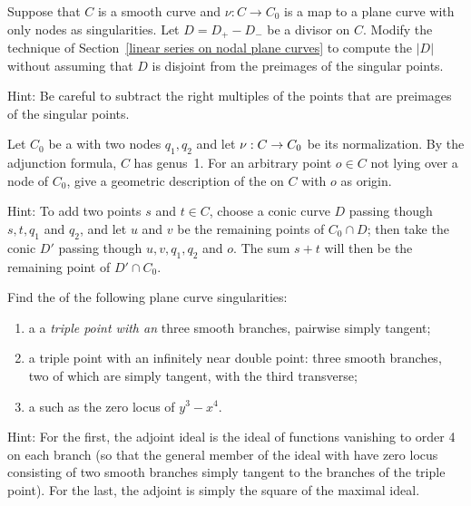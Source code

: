 \begin{exercise}\label{general case of divisors on nodal curves}
Suppose that $C$ is a smooth curve and $\nu: C \to C_0$ is a map to a
plane curve with
only nodes as singularities. Let $D = D_{+}-D_{-}$ be a divisor on
$C$. Modify the
technique of Section~\ref{linear series on nodal plane curves} to compute
the 
$|D|$ without assuming that $D$ is disjoint from the
preimages of the singular
points.

Hint: Be careful to subtract the right multiples of the points that are
preimages of the singular
points.
\end{exercise}

\begin{exercise}
Let $C_0$ be a 
%
%
with two nodes $q_1, q_2$
and
let $\nu :\nobreak C \to C_0$ be its normalization.
%
By the adjunction formula, $C$ has genus~1.
For an arbitrary point
$o \in C$ not
lying over a node of $C_0$,
 give a geometric description
of the 
on $C$ with $o$ as origin.

Hint: To add two points $s$ and $t \in C$, choose a conic curve $D$
passing though $s, t, q_1$ and $q_2$, and let $u$ and $v$ be the remaining
points of $C_0 \cap D$; then take the conic
$D'$ passing though $u, v,
q_1, q_2$ and $o$. The sum $s+t$ will then be the remaining point of $D'
\cap C_0$.
\end{exercise}

\begin{exercise}
Find the 
of the following plane curve singularities:
%
\begin{enumerate}
\item a 
a \emph{triple point with an}
three smooth branches, pairwise simply
tangent;
\item a triple point with an infinitely near double point: three smooth
branches, two of which are simply tangent, with the third transverse;
\item a 
such as the zero locus of $y^3-x^4$.
\end{enumerate}

Hint: For the first, the adjoint ideal is the ideal of functions vanishing
to order 4 on each branch (so that the general member of the ideal with
have zero locus consisting of two smooth branches simply tangent to the
branches of the triple point). For the last, the adjoint is simply the
square of the maximal ideal.
\end{exercise}

